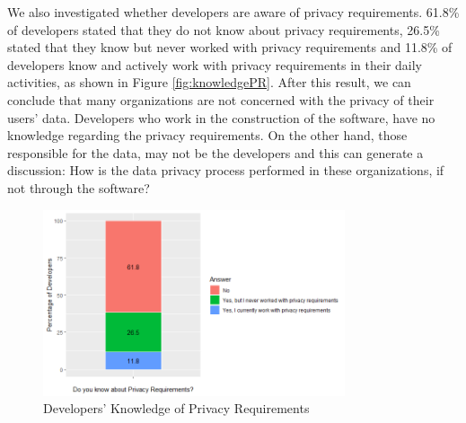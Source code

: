 \documentclass[conference]{IEEEtran}
\begin{document}

We also investigated whether developers are aware of privacy requirements. 61.8\% of developers stated that they do not know about privacy requirements, 26.5\% stated that they know but never worked with privacy requirements and 11.8\% of developers know and actively work with privacy requirements in their daily activities, as shown in Figure \ref{fig:knowledgePR}. After this result, we can conclude that many organizations are not concerned with the privacy of their users' data. Developers who work in the construction of the software, have no knowledge regarding the privacy requirements. On the other hand, those responsible for the data, may not be the developers and this can generate a discussion: How is the data privacy process performed in these organizations, if not through the software?

\begin{figure}[!htb]
    \centering
    \includegraphics[width=3.5in]{Figures/RQ14.png}
    \caption{Developers' Knowledge of Privacy Requirements}
    \label{fig:conhecimentoPR}
\end{figure}
\end{document}
